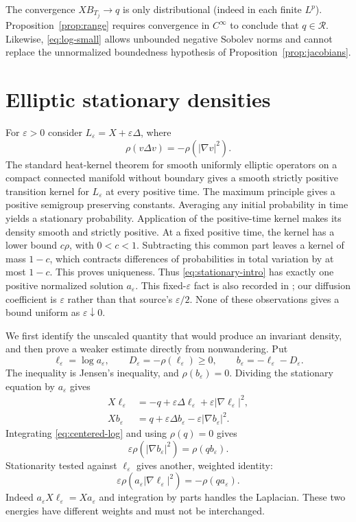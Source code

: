 \documentclass[11pt]{article}
\theoremstyle{definition}
\theoremstyle{remark}
\newcommand{\calR}{\mathcal R}
\newcommand{\eps}{\varepsilon}
\begin{document}
The convergence $XB_{T_j}\to q$ is only distributional (indeed in each finite $L^p$). Proposition~\ref{prop:range} requires convergence in $C^\infty$ to conclude that $q\in\calR$. Likewise, \eqref{eq:log-small} allows unbounded negative Sobolev norms and cannot replace the unnormalized boundedness hypothesis of Proposition~\ref{prop:jacobians}.

\section{Elliptic stationary densities}
\label{sec:noise}

For $\eps>0$ consider $L_\eps=X+\eps\Delta$, where
\[
 \rho(v\Delta v)=-\rho(|\nabla v|^2).
\]
The standard heat-kernel theorem for smooth uniformly elliptic operators on a compact connected manifold without boundary gives a smooth strictly positive transition kernel for $L_\eps$ at every positive time. The maximum principle gives a positive semigroup preserving constants. Averaging any initial probability in time yields a stationary probability. Application of the positive-time kernel makes its density smooth and strictly positive. At a fixed positive time, the kernel has a lower bound $c\rho$, with $0<c<1$. Subtracting this common part leaves a kernel of mass $1-c$, which contracts differences of probabilities in total variation by at most $1-c$. This proves uniqueness. Thus \eqref{eq:stationary-intro} has exactly one positive normalized solution $a_\eps$. This fixed-$\eps$ fact is also recorded in \cite[\S1, after (1.7)]{AY}; our diffusion coefficient is $\eps$ rather than that source's $\eps/2$. None of these observations gives a bound uniform as $\eps\downarrow0$.

We first identify the unscaled quantity that would produce an invariant density, and then prove a weaker estimate directly from nonwandering. Put
\begin{equation}\label{eq:entropy-densities}
 \ell_\eps=\log a_\eps,\qquad
 D_\eps=-\rho(\ell_\eps)\ge0,\qquad
 b_\eps=-\ell_\eps-D_\eps.
\end{equation}
The inequality is Jensen's inequality, and $\rho(b_\eps)=0$. Dividing the stationary equation by $a_\eps$ gives
\begin{align}
 X\ell_\eps&=-q+\eps\Delta\ell_\eps+\eps|\nabla\ell_\eps|^2,\label{eq:log-eq}\\
 Xb_\eps&=q+\eps\Delta b_\eps-\eps|\nabla b_\eps|^2.\label{eq:centered-log}
\end{align}
Integrating \eqref{eq:centered-log} and using $\rho(q)=0$ gives
\begin{equation}\label{eq:unweighted-energy}
 \eps\rho(|\nabla b_\eps|^2)=\rho(qb_\eps).
\end{equation}
Stationarity tested against $\ell_\eps$ gives another, weighted identity:
\begin{equation}\label{eq:weighted-energy}
 \eps\rho(a_\eps|\nabla\ell_\eps|^2)=-\rho(qa_\eps).
\end{equation}
Indeed $a_\eps X\ell_\eps=Xa_\eps$ and integration by parts handles the Laplacian. These two energies have different weights and must not be interchanged.
\end{document}
